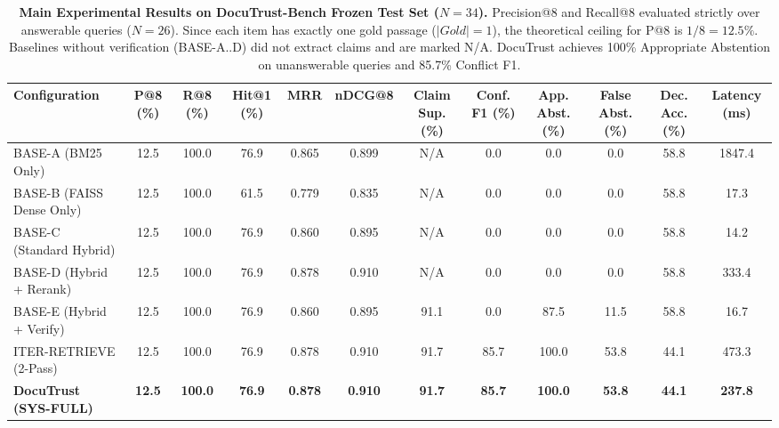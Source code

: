 
\begin{table}[t]
\centering
\small
\begin{tabular}{lccccccccccc}
\toprule
\textbf{Configuration} & \textbf{P@8 (\%)} & \textbf{R@8 (\%)} & \textbf{Hit@1 (\%)} & \textbf{MRR} & \textbf{nDCG@8} & \textbf{Claim Sup. (\%)} & \textbf{Conf. F1 (\%)} & \textbf{App. Abst. (\%)} & \textbf{False Abst. (\%)} & \textbf{Dec. Acc. (\%)} & \textbf{Latency (ms)} \\
\midrule
BASE-A (BM25 Only)        & 12.5 & 100.0 & 76.9 & 0.865 & 0.899 & N/A & 0.0  & 0.0   & 0.0  & 58.8 & 1847.4 \\
BASE-B (FAISS Dense Only) & 12.5 & 100.0 & 61.5 & 0.779 & 0.835 & N/A & 0.0  & 0.0   & 0.0  & 58.8 & 17.3   \\
BASE-C (Standard Hybrid)  & 12.5 & 100.0 & 76.9 & 0.860 & 0.895 & N/A & 0.0  & 0.0   & 0.0  & 58.8 & 14.2   \\
BASE-D (Hybrid + Rerank)  & 12.5 & 100.0 & 76.9 & 0.878 & 0.910 & N/A & 0.0  & 0.0   & 0.0  & 58.8 & 333.4  \\
BASE-E (Hybrid + Verify)  & 12.5 & 100.0 & 76.9 & 0.860 & 0.895 & 91.1 & 0.0  & 87.5  & 11.5 & 58.8 & 16.7   \\
ITER-RETRIEVE (2-Pass)    & 12.5 & 100.0 & 76.9 & 0.878 & 0.910 & 91.7 & 85.7 & 100.0 & 53.8 & 44.1 & 473.3  \\
\textbf{DocuTrust (SYS-FULL)} & \textbf{12.5} & \textbf{100.0} & \textbf{76.9} & \textbf{0.878} & \textbf{0.910} & \textbf{91.7} & \textbf{85.7} & \textbf{100.0} & \textbf{53.8} & \textbf{44.1} & \textbf{237.8} \\
\bottomrule
\end{tabular}
\caption{\textbf{Main Experimental Results on DocuTrust-Bench Frozen Test Set ($N=34$).} Precision@8 and Recall@8 evaluated strictly over answerable queries ($N=26$). Since each item has exactly one gold passage ($|Gold|=1$), the theoretical ceiling for P@8 is $1/8 = 12.5\%$. Baselines without verification (BASE-A..D) did not extract claims and are marked N/A. DocuTrust achieves 100\% Appropriate Abstention on unanswerable queries and 85.7\% Conflict F1.}
\label{tab:main_results}
\end{table}


